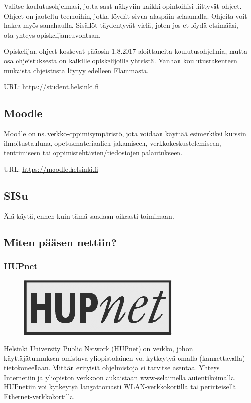 \documentclass[a5paper, 8pt, twocolumn]{book} %
\numberwithin{equation}{section}
\begin{document}
Valitse koulutusohjelmasi, jotta saat näkyviin kaikki opintoihisi liittyvät ohjeet. Ohjeet on jaoteltu teemoihin, jotka löydät sivua alaspäin selaamalla. Ohjeita voit hakea myös sanahaulla. Sisällöt täydentyvät vielä, joten jos et löydä etsimääsi, ota yhteys opiskelijaneuvontaan.

Opiskelijan ohjeet koskevat pääosin 1.8.2017 aloittaneita koulutusohjelmia, mutta osa ohjeistuksesta on kaikille opiskelijoille yhteistä. Vanhan koulutusrakenteen mukaista ohjeistusta löytyy edelleen Flammasta.

\noindent URL: \url{https://student.helsinki.fi}
\subsection*{Moodle}
Moodle on ns.\,verkko-oppimis\-ympäristö, jota voidaan käyttää esimerkiksi kurssin ilmoitustauluna, opetusmateriaalien jakamiseen, verkkokeskustelemiseen, tenttimiseen tai oppimistehtävien/tiedostojen palautukseen.

\noindent URL: \url{https://moodle.helsinki.fi}
\subsection*{SISu}
Älä käytä, ennen kuin tämä saadaan oikeasti toimimaan.

\subsection*{Miten pääsen nettiin?}
\subsubsection*{HUPnet}
\begin{figure}[h!]
	\centering
	\includegraphics[width=\columnwidth]{hupnet.png}
\end{figure}
Helsinki University Public Network
(HUPnet) on verkko, johon käyttäjätunnuksen
omistava yliopistolainen voi kytkeytyä
omalla (kannettavalla) tietokoneellaan.
Mitään erityisiä ohjelmistoja ei tarvitse
asentaa. Yhteys Internetiin ja yliopiston
verkkoon aukaistaan www-selaimella autentikoimalla.
HUPnetiin voi kytkeytyä langattomasti
WLAN-verkkokortilla tai perinteisellä
Ethernet-verkkokortilla.
\end{document}
